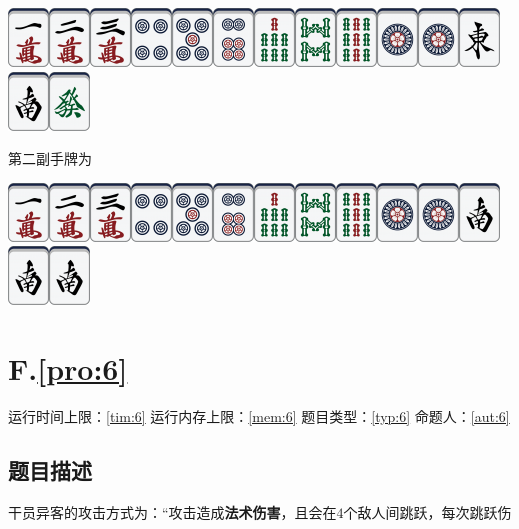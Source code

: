 \documentclass[
	lang=cn,
	color=green
]{elegantbook}
\begin{document}
\begin{center}
\includegraphics[scale=0.5]{images/mahjong/1m.png}\includegraphics[scale=0.5]{images/mahjong/2m.png}\includegraphics[scale=0.5]{images/mahjong/3m.png}\includegraphics[scale=0.5]{images/mahjong/4p.png}\includegraphics[scale=0.5]{images/mahjong/5p.png}\includegraphics[scale=0.5]{images/mahjong/6p.png}\includegraphics[scale=0.5]{images/mahjong/7s.png}\includegraphics[scale=0.5]{images/mahjong/8s.png}\includegraphics[scale=0.5]{images/mahjong/9s.png}\includegraphics[scale=0.5]{images/mahjong/1p.png}\includegraphics[scale=0.5]{images/mahjong/1p.png}\includegraphics[scale=0.5]{images/mahjong/1z.png}\includegraphics[scale=0.5]{images/mahjong/2z.png}\includegraphics[scale=0.5]{images/mahjong/6z.png}
\end{center}

第二副手牌为

\begin{center}
\includegraphics[scale=0.5]{images/mahjong/1m.png}\includegraphics[scale=0.5]{images/mahjong/2m.png}\includegraphics[scale=0.5]{images/mahjong/3m.png}\includegraphics[scale=0.5]{images/mahjong/4p.png}\includegraphics[scale=0.5]{images/mahjong/5p.png}\includegraphics[scale=0.5]{images/mahjong/6p.png}\includegraphics[scale=0.5]{images/mahjong/7s.png}\includegraphics[scale=0.5]{images/mahjong/8s.png}\includegraphics[scale=0.5]{images/mahjong/9s.png}\includegraphics[scale=0.5]{images/mahjong/1p.png}\includegraphics[scale=0.5]{images/mahjong/1p.png}\includegraphics[scale=0.5]{images/mahjong/2z.png}\includegraphics[scale=0.5]{images/mahjong/2z.png}\includegraphics[scale=0.5]{images/mahjong/2z.png}
\end{center}


\newpage
\chapter*{F.\quad \ref*{pro:6}}
\begin{center}
    运行时间上限：\ref*{tim:6} \quad 运行内存上限：\ref*{mem:6} \quad 题目类型：\ref*{typ:6} \quad 命题人：\ref*{aut:6}
\end{center}

\section*{题目描述}
干员异客的攻击方式为：“攻击造成\textbf{法术伤害}，且会在$4$个敌人间跳跃，每次跳跃伤
\end{document}
